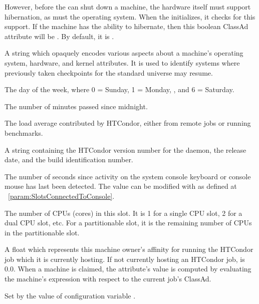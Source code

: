 \begin{description}
However, before the  can shut down a machine, 
the hardware itself must support hibernation, as must the operating system. 
When the  initializes, 
it checks for this support.
If the machine has the ability to hibernate, 
then this boolean ClassAd attribute will be .
By default, it is .
%
\label{CheckpointPlatform-machine-attribute}
\item[\AdAttr{CheckpointPlatform}:] A string which opaquely encodes various
aspects about a machine's operating system, hardware, and kernel
attributes.
It is used to identify systems where previously taken checkpoints for
the standard universe may resume.
%
\item[\AdAttr{ClockDay}:] The day of the week, 
where 0 = Sunday, 1 = Monday, \Dots, and 6 = Saturday. 
%
\item[\AdAttr{ClockMin}:] The number of minutes passed since midnight.
%
\item[\AdAttr{CondorLoadAvg}:] The load average contributed  
by HTCondor, either from remote jobs or running benchmarks.
%
\item[\AdAttr{CondorVersion}:] A string containing the HTCondor version
number for the  daemon, the release date, and the build
identification number.
%
\item[\AdAttr{ConsoleIdle}:] The number of seconds since activity on the system
console keyboard or console mouse has last been detected.
The value can be modified with 
as defined at ~\ref{param:SlotsConnectedToConsole}.
%
\item[\AdAttr{Cpus}:]  The number of CPUs (cores) in this slot.
It is 1 for a single CPU slot, 2 for a dual CPU slot, etc.
For a partitionable slot, it is the remaining number of CPUs
in the partitionable slot. 
%
\item[\AdAttr{CurrentRank}:] A float which represents this machine
owner's affinity
for running the HTCondor job which it is currently hosting.  If not
currently hosting an HTCondor job,  is 0.0.
When a machine is claimed,
the attribute's value is computed by evaluating the machine's
 expression with respect to the current job's ClassAd.
%
\item[\AdAttr{DetectedCpus}:] 
Set by the value of configuration variable .


\end{description}
